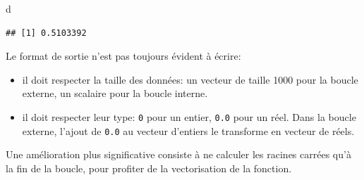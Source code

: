 \documentclass[
  11pt,
  french,
  a4paper,
  extrafontsizes,onecolumn,openright
  ]{memoir}
\newenvironment{Shaded}{\begin{snugshade}}{\end{snugshade}}
\newcommand{\ControlFlowTok}[1]{\textcolor[rgb]{0.13,0.29,0.53}{\textbf{#1}}}
\newcommand{\DecValTok}[1]{\textcolor[rgb]{0.00,0.00,0.81}{#1}}
\newcommand{\FunctionTok}[1]{\textcolor[rgb]{0.00,0.00,0.00}{#1}}
\newcommand{\NormalTok}[1]{#1}
\newcommand{\OtherTok}[1]{\textcolor[rgb]{0.56,0.35,0.01}{#1}}
\newcommand{\SpecialCharTok}[1]{\textcolor[rgb]{0.00,0.00,0.00}{#1}}
\providecommand{\tightlist}{%
  \setlength{\itemsep}{0pt}\setlength{\parskip}{0pt}}
\begin{document}
\begin{Shaded}
\begin{Highlighting}[]
\NormalTok{d}
\end{Highlighting}
\end{Shaded}

\begin{verbatim}
## [1] 0.5103392
\end{verbatim}

\normalsize
Le format de sortie n'est pas toujours évident à écrire:

\begin{itemize}
\tightlist
\item
  il doit respecter la taille des données: un vecteur de taille 1000 pour la boucle externe, un scalaire pour la boucle interne.
\item
  il doit respecter leur type: \texttt{0} pour un entier, \texttt{0.0} pour un réel. Dans la boucle externe, l'ajout de \texttt{0.0} au vecteur d'entiers le transforme en vecteur de réels.
\end{itemize}

Une amélioration plus significative consiste à ne calculer les racines carrées qu'à la fin de la boucle, pour profiter de la vectorisation de la fonction.

\scriptsize

\begin{Shaded}
\end{Shaded}
\end{document}
